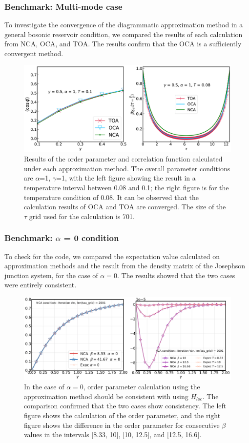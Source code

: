 \documentclass{article}[12pt]
\numberwithin{equation}{section}
\begin{document}
\begin{spacing}{1.5}
\subsubsection*{Benchmark: Multi-mode case}
To investigate the convergence of the diagrammatic approximation method in a general bosonic reservoir condition, we compared the results of each calculation from NCA, OCA, and TOA. 
The results confirm that the OCA is a sufficiently convergent method.
\begin{figure}[H]
  \centerline{\includegraphics[width=13cm]{TexFigure/4/4_1_02_Multi.png}}
  \caption{Results of the order parameter and correlation function calculated under each approximation method. 
  The overall parameter conditions are $\alpha$=1, $\gamma$=1, with the left figure showing the result in a temperature interval between 0.08 and 0.1; the right figure is for the temperature condition of 0.08. It can be observed that the calculation results of OCA and TOA are converged. 
  The size of the $\tau$ grid used for the calculation is 701.}
 \end{figure}
\subsubsection*{Benchmark: $\alpha$ = 0 condition}
To check for the code, we compared the expectation value calculated on approximation methods and the result from the density matrix of the Josephson junction system, for the case of $\alpha=0$. 
The results showed that the two cases were entirely consistent.
\begin{figure}[H]
  \centerline{\includegraphics[width=13cm]{TexFigure/4/4_1_03_zero.png}}
  \caption{In the case of $\alpha = 0$, order parameter calculation using the approximation method should be consistent with using $H_{loc}$.
  The comparison confirmed that the two cases show consistency. The left figure shows the calculation of the order parameter, 
  and the right figure shows the difference in the order parameter for consecutive $\beta$ values
  in the intervals [8.33, 10], [10, 12.5], and [12.5, 16.6].}
 \end{figure}
\pagebreak

\end{spacing}
\end{document}
